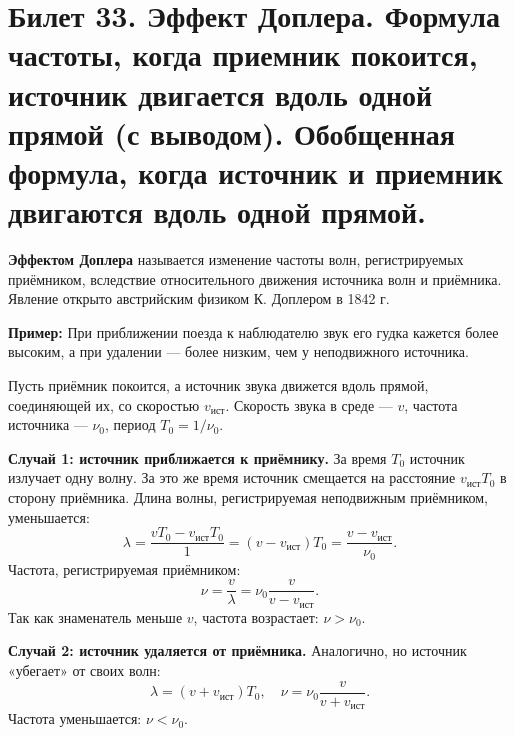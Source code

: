 \section{Билет 33. Эффект Доплера. Формула частоты, когда приемник покоится, источник двигается вдоль одной прямой (с выводом). Обобщенная формула, когда источник и приемник двигаются вдоль одной прямой.}

\begin{definition}
\textbf{Эффектом Доплера} называется изменение частоты волн, регистрируемых приёмником, вследствие относительного движения источника волн и приёмника. Явление открыто австрийским физиком К. Доплером в 1842 г.
\par\noindent\textbf{Пример:} При приближении поезда к наблюдателю звук его гудка кажется более высоким, а при удалении --- более низким, чем у неподвижного источника.
\end{definition}

\begin{theorem}
Пусть приёмник покоится, а источник звука движется вдоль прямой, соединяющей их, со скоростью $v_{\text{ист}}$. Скорость звука в среде --- $v$, частота источника --- $\nu_0$, период $T_0 = 1/\nu_0$.

\textbf{Случай 1: источник приближается к приёмнику.}
За время $T_0$ источник излучает одну волну. За это же время источник смещается на расстояние $v_{\text{ист}} T_0$ в сторону приёмника. Длина волны, регистрируемая неподвижным приёмником, уменьшается:
\begin{equation}
    \lambda = \frac{v T_0 - v_{\text{ист}} T_0}{1} = (v - v_{\text{ист}}) T_0 = \frac{v - v_{\text{ист}}}{\nu_0}.
\end{equation}
Частота, регистрируемая приёмником:
\begin{equation}
    \nu = \frac{v}{\lambda} = \nu_0 \frac{v}{v - v_{\text{ист}}}. \label{eq:doppler_source_approach}
\end{equation}
Так как знаменатель меньше $v$, частота возрастает: $\nu > \nu_0$.

\textbf{Случай 2: источник удаляется от приёмника.}
Аналогично, но источник «убегает» от своих волн:
\begin{equation}
    \lambda = (v + v_{\text{ист}}) T_0, \quad \nu = \nu_0 \frac{v}{v + v_{\text{ист}}}. \label{eq:doppler_source_recede}
\end{equation}
Частота уменьшается: $\nu < \nu_0$.
\end{theorem}

